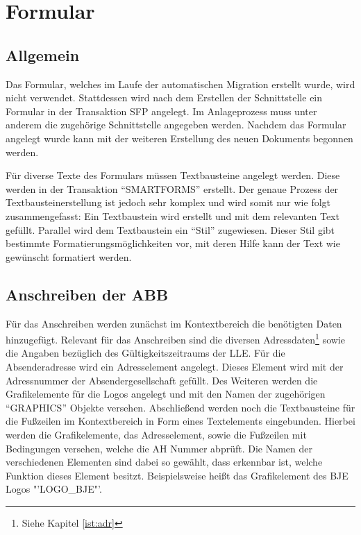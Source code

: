 \FloatBarrier
\section{Formular}
\subsection{Allgemein}

Das Formular, welches im Laufe der automatischen Migration erstellt wurde, wird nicht verwendet. Stattdessen wird nach dem Erstellen der Schnittstelle ein Formular in der Transaktion SFP angelegt. Im Anlageprozess muss unter anderem die zugehörige Schnittstelle angegeben werden. Nachdem das Formular angelegt wurde kann mit der weiteren Erstellung des neuen Dokuments begonnen werden.

Für diverse Texte des Formulars müssen Textbausteine angelegt werden. Diese werden in der Transaktion "`SMARTFORMS"' erstellt. Der genaue Prozess der Textbausteinerstellung ist jedoch sehr komplex und wird somit nur wie folgt zusammengefasst: Ein Textbaustein wird erstellt und mit dem relevanten Text gefüllt. Parallel wird dem Textbaustein ein "`Stil"' zugewiesen. Dieser Stil gibt bestimmte Formatierungsmöglichkeiten vor, mit deren Hilfe kann der Text wie gewünscht formatiert werden.

\subsection{Anschreiben der \acs{ABB}}

Für das Anschreiben werden zunächst im Kontextbereich die benötigten Daten hinzugefügt. Relevant für das Anschreiben sind die diversen Adressdaten\footnote{Siehe Kapitel \ref{ist:adr}} sowie die Angaben bezüglich des Gültigkeitszeitraums der \ac{LLE}. Für die Absenderadresse wird ein Adresselement angelegt. Dieses Element wird mit der Adressnummer der Absendergesellschaft gefüllt. Des Weiteren werden die Grafikelemente für die Logos angelegt und mit den Namen der zugehörigen "`GRAPHICS"' Objekte versehen. Abschließend werden noch die Textbausteine für die Fußzeilen im Kontextbereich in Form eines Textelements eingebunden. Hierbei werden die Grafikelemente, das Adresselement, sowie die Fußzeilen mit Bedingungen versehen, welche die \ac{AH} Nummer abprüft. Die Namen der verschiedenen Elementen sind dabei so gewählt, dass erkennbar ist, welche Funktion dieses Element besitzt. Beispielsweise heißt das Grafikelement des \ac{BJE} Logos "'LOGO\_BJE"'. 

